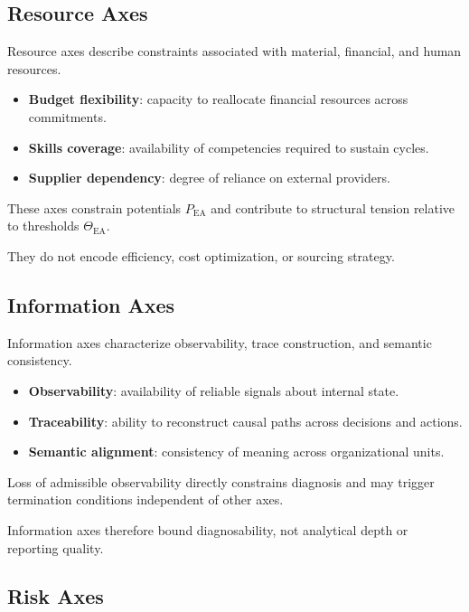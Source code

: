 \subsection{Resource Axes}

Resource axes describe constraints associated with material, financial,
and human resources.

\begin{itemize}
  \item \textbf{Budget flexibility}: capacity to reallocate financial
        resources across commitments.
  \item \textbf{Skills coverage}: availability of competencies required
        to sustain cycles.
  \item \textbf{Supplier dependency}: degree of reliance on external
        providers.
\end{itemize}

These axes constrain potentials $P_{\mathrm{EA}}$ and contribute to
structural tension relative to thresholds $\Theta_{\mathrm{EA}}$.

They do not encode efficiency, cost optimization, or sourcing strategy.

\subsection{Information Axes}

Information axes characterize observability, trace construction, and
semantic consistency.

\begin{itemize}
  \item \textbf{Observability}: availability of reliable signals about
        internal state.
  \item \textbf{Traceability}: ability to reconstruct causal paths
        across decisions and actions.
  \item \textbf{Semantic alignment}: consistency of meaning across
        organizational units.
\end{itemize}

Loss of admissible observability directly constrains diagnosis and may
trigger termination conditions independent of other axes.

Information axes therefore bound diagnosability, not analytical depth or
reporting quality.

\subsection{Risk Axes}

